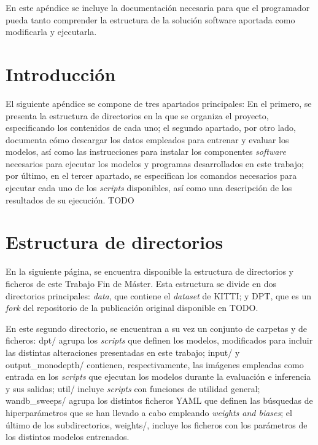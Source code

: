 
En este apéndice se incluye la documentación necesaria para que el programador pueda tanto comprender la estructura de la solución software aportada como modificarla y ejecutarla.

\section{Introducción}
El siguiente apéndice se compone de tres apartados principales: En el primero, se presenta la estructura de directorios en la que se organiza el proyecto, especificando los contenidos de cada uno; el segundo apartado, por otro lado, documenta cómo descargar los datos empleados para entrenar y evaluar los modelos, así como las instrucciones para instalar los componentes \textit{software} necesarios para ejecutar los modelos y programas desarrollados en este trabajo; por último, en el tercer apartado, se especifican los comandos necesarios para ejecutar cada uno de los \textit{scripts} disponibles, así como una descripción de los resultados de su ejecución. TODO

\section{Estructura de directorios}

En la siguiente página, se encuentra disponible la estructura de directorios y ficheros de este Trabajo Fin de Máster. Esta estructura se divide en dos directorios principales: \textit{data}, que contiene el \textit{dataset} de KITTI; y DPT, que es un \textit{fork} del repositorio de la publicación original \cite{visiontransformersDPT} disponible en \url{} TODO.

En este segundo directorio, se encuentran a su vez un conjunto de carpetas y de ficheros: dpt/ agrupa los \textit{scripts} que definen los modelos, modificados para incluir las distintas alteraciones presentadas en este trabajo; input/ y output{\_}monodepth/ contienen, respectivamente, las imágenes empleadas como entrada en los \textit{scripts} que ejecutan los modelos durante la evaluación e inferencia y sus salidas; util/ incluye \textit{scripts} con funciones de utilidad general; wandb{\_}sweeps/ agrupa los distintos ficheros YAML que definen las búsquedas de hiperparámetros que se han llevado a cabo empleando \textit{weights and biases}; el último de los subdirectorios, weights/, incluye los ficheros con los parámetros de los distintos modelos entrenados.

